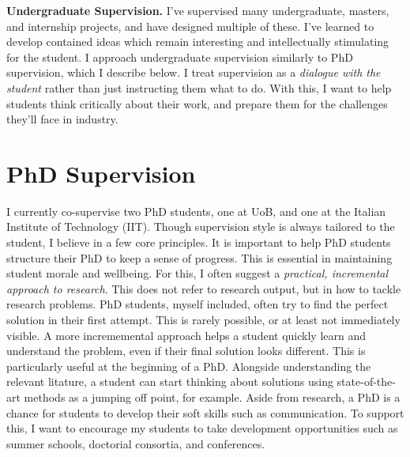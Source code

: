 \documentclass[12pt]{article}
\begin{document}
\vspace*{1ex}\noindent\textbf{Undergraduate Supervision.} I've supervised many undergraduate, masters, and internship projects, and have designed multiple of these.
%
I've learned to develop contained ideas which remain interesting and intellectually stimulating for the student.
%
I approach undergraduate supervision similarly to PhD supervision, which I describe below.
%
I treat supervision as a \emph{dialogue with the student} rather than just instructing them what to do.
%
With this, I want to help students think critically about their work, and prepare them for the challenges they'll face in industry.

\section*{PhD Supervision}
%
I currently co-supervise two PhD students, one at UoB, and one at the Italian Institute of Technology (IIT).
%
Though supervision style is always tailored to the student, I believe in a few core principles.
%
It is important to help PhD students structure their PhD to keep a sense of progress.
%
This is essential in maintaining student morale and wellbeing.
%
For this, I often suggest a \emph{practical, incremental approach to research}.
%
This does not refer to research output, but in how to tackle research problems.
%
PhD students, myself included, often try to find the perfect solution in their first attempt.
%
This is rarely possible, or at least not immediately visible.
%
A more incrememental approach helps a student quickly learn and understand the problem, even if their final solution looks different.
%
This is particularly useful at the beginning of a PhD.
%
Alongside understanding the relevant litature, a student can start thinking about solutions using state-of-the-art methods as a jumping off point, for example.
%
Aside from research, a PhD is a chance for students to develop their soft skills such as communication.
%
To support this, I want to encourage my students to take development opportunities such as summer schools, doctorial consortia, and conferences.

\end{document}
